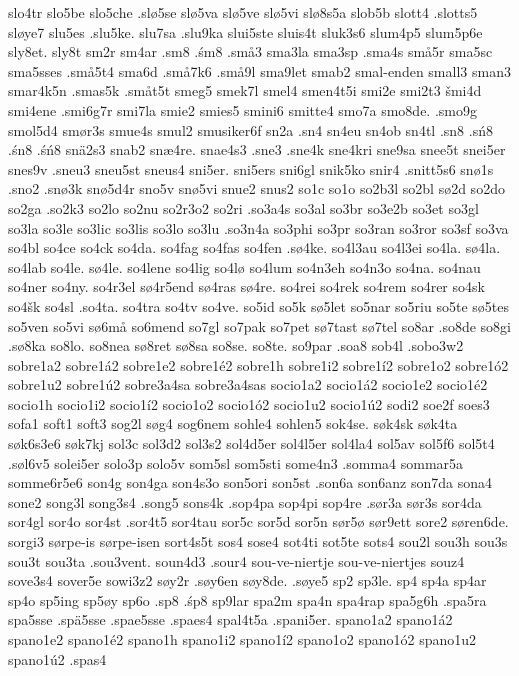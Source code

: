 {{slo4tr
slo5be
slo5che
.slø5se
slø5va
slø5ve
slø5vi
slø8s5a
slob5b
slott4
.slotts5
sløye7
slu5es
.slu5ke.
slu7sa
.slu9ka
slui5ste
sluis4t
sluk3s6
slum4p5
slum5p6e
sly8et.
sly8t
sm2r
sm4ar
.sm8
.śm8
.små3
sma3la
sma3sp
.sma4s
små5r
sma5sc
sma5sses
.små5t4
sma6d
.små7k6
.små9l
sma9let
smab2
smal-enden
small3
sman3
smar4k5n
.smas5k
.småt5t
smeg5
smek7l
smel4
smen4t5i
smi2e
smi2t3
šmi4d
smi4ene
.smi6g7r
smi7la
smie2
smies5
smini6
smitte4
smo7a
smo8de.
.smo9g
smol5d4
smør3s
smue4s
smul2
smusiker6f
sn2a
.sn4
sn4eu
sn4ob
sn4tl
.sn8
.sń8
.śn8
.śń8
snä2s3
snab2
snæ4re.
snae4s3
.sne3
.sne4k
sne4kri
sne9sa
snee5t
snei5er
snes9v
.sneu3
sneu5st
sneus4
sni5er.
sni5ers
sni6gl
snik5ko
snir4
.snitt5s6
snø1s
.sno2
.snø3k
snø5d4r
sno5v
snø5vi
snue2
snus2
so1c
so1o
so2b3l
so2bl
sø2d
so2do
so2ga
.so2k3
so2lo
so2nu
so2r3o2
so2ri
.so3a4s
so3al
so3br
so3e2b
so3et
so3gl
so3la
so3le
so3lic
so3lis
so3lo
so3lu
.so3n4a
so3phi
so3pr
so3ran
so3ror
so3sf
so3va
so4bl
so4ce
so4ck
so4da.
so4fag
so4fas
so4fen
.sø4ke.
so4l3au
so4l3ei
so4la.
sø4la.
so4lab
so4le.
sø4le.
so4lene
so4lig
so4lø
so4lum
so4n3eh
so4n3o
so4na.
so4nau
so4ner
so4ny.
so4r3el
sø4r5end
sø4ras
sø4re.
so4rei
so4rek
so4rem
so4rer
so4sk
so4šk
so4sl
.so4ta.
so4tra
so4tv
so4ve.
so5id
so5k
sø5let
so5nar
so5riu
so5te
sø5tes
so5ven
so5vi
sø6må
so6mend
so7gl
so7pak
so7pet
sø7tast
sø7tel
so8ar
.so8de
so8gi
.sø8ka
so8lo.
so8nea
sø8ret
sø8sa
so8se.
so8te.
so9par
.soa8
sob4l
.sobo3w2
sobre1a2
sobre1á2
sobre1e2
sobre1é2
sobre1h
sobre1i2
sobre1í2
sobre1o2
sobre1ó2
sobre1u2
sobre1ú2
sobre3a4sa
sobre3a4sas
socio1a2
socio1á2
socio1e2
socio1é2
socio1h
socio1i2
socio1í2
socio1o2
socio1ó2
socio1u2
socio1ú2
sodi2
soe2f
soes3
sofa1
soft1
soft3
sog2l
søg4
sog6nem
sohle4
sohlen5
sok4se.
søk4sk
søk4ta
søk6s3e6
søk7kj
sol3c
sol3d2
sol3s2
sol4d5er
sol4l5er
sol4la4
sol5av
sol5f6
sol5t4
.søl6v5
solei5er
solo3p
solo5v
som5sl
som5sti
some4n3
.somma4
sommar5a
somme6r5e6
son4g
son4ga
son4s3o
son5ori
son5st
.son6a
son6anz
son7da
sona4
sone2
song3l
song3s4
.song5
sons4k
.sop4pa
sop4pi
sop4re
.sør3a
sør3s
sor4da
sor4gl
sor4o
sor4st
.sor4t5
sor4tau
sor5c
sor5d
sor5n
sør5ø
sør9ett
sore2
søren6de.
sorgi3
sørpe-is
sørpe-isen
sort4s5t
sos4
sose4
sot4ti
sot5te
sots4
sou2l
sou3h
sou3s
sou3t
sou3ta
.sou3vent.
soun4d3
.sour4
sou-ve-niertje
sou-ve-niertjes
souz4
sove3s4
sover5e
sowi3z2
søy2r
.søy6en
søy8de.
.søye5
sp2
sp3le.
sp4
sp4a
sp4ar
sp4o
sp5ing
sp5øy
sp6o
.sp8
.śp8
sp9lar
spa2m
spa4n
spa4rap
spa5g6h
.spa5ra
spa5sse
.spä5sse
.spae5sse
.spaes4
spal4t5a
.spani5er.
spano1a2
spano1á2
spano1e2
spano1é2
spano1h
spano1i2
spano1í2
spano1o2
spano1ó2
spano1u2
spano1ú2
.spas4
}}
